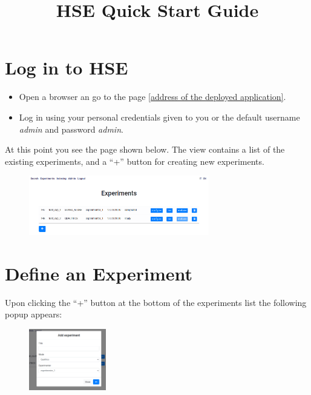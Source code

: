 \documentclass[fleqn]{article}
\title{HSE Quick Start Guide}
\begin{document}
\setlength{\parindent}{0cm}

\maketitle

\section{Log in to HSE}

\begin{itemize}

    \item Open a browser an go to the page \href{http://www.robix-projects.org/hse}{[address of the deployed application]}.

    \item Log in using your personal credentials given to you or the default username \emph{admin} and password \emph{admin}.

\end{itemize}

At this point you see the page shown below. The view contains a list of the existing experiments, and a ``+'' button
for creating new experiments.

\begin{figure}[h!]
\centering
\includegraphics[width=0.7\textwidth]{img/expMain}
\end{figure}

\section{Define an Experiment}

Upon clicking the ``+'' button at the bottom of the experiments list the following popup appears: 

\begin{figure}[h!]
\centering
\includegraphics[width=0.3\textwidth]{img/expCreate}
\end{figure}
\end{document}
